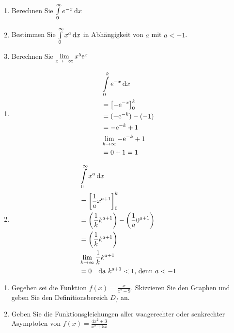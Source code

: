 	\begin{enumerate}
		\item Berechnen Sie $\int\limits^\infty_0 e^{-x}\,\mathrm{d} x$
		\item	Bestimmen Sie $\int\limits^\infty_0 x^a\,\mathrm{d} x$ in Abhängigkeit von $a$ mit $a < -1$.
		\item Berechnen Sie $\lim\limits_{x\rightarrow -\infty} x^5\mathrm{e}^x$
	\end{enumerate}
	\begin{lsg}{}
		\begin{enumerate}
			\item \begin{align*}
				&\int\limits^k_0 e^{-x}\,\mathrm{d} x\\
				&=\left[-\mathrm{e}^{-x}\right]_0^k\\
				&=(-\mathrm{e}^{-k})-(-1)\\
				&=-\mathrm{e}^{-k}+1\\
				&\lim\limits_{k\rightarrow \infty}-\mathrm{e}^{-k}+1\\
				&=0+1=1
			\end{align*}
			\item \begin{align*}
				&\int\limits^\infty_0 x^a\,\mathrm{d} x\\
				&=\left[\frac1 a x^{a+1}\right]_0^k\\
				&=\left(\frac1 k k^{a+1}\right)-\left(\frac1 a 0^{a+1}\right)\\
				&=\left(\frac1 k k^{a+1}\right)\\
				&\lim\limits_{k\rightarrow \infty}\frac1 k k^{a+1}\\
				&=0\quad \text{da $k^{a+1}<1$, denn $a<-1$}
			\end{align*}
		\end{enumerate}
	\end{lsg}



	\begin{enumerate}
		\item Gegeben sei die Funktion $f(x)=\frac{x}{x^2-9}$. Skizzieren Sie den Graphen und geben Sie den Definitionsbereich $D_f$ an.
		\item	Geben Sie die Funktionsgleichungen aller waagerechter oder senkrechter Asymptoten von $f(x)=\frac{4x^2+3}{x^2+5x}$
	\end{enumerate}



